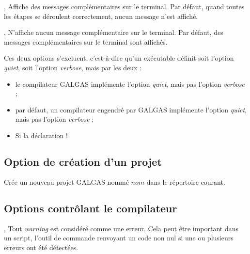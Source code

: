 {


,  Affiche des messages complémentaires sur le terminal. Par défaut, quand toutes les étapes se déroulent correctement, aucun message n’est affiché.

,  N'affiche aucun message complémentaire sur le terminal. Par défaut, des messages complémentaires sur le terminal sont affichés.

Ces deux options s'excluent, c'est-à-dire qu'un exécutable définit soit l'option \emph{quiet}, soit l'option \emph{verbose}, mais par les deux :
\begin{itemize}
  \item le compilateur GALGAS implémente l'option \emph{quiet}, mais pas l'option \emph{verbose} ;
  \item par défaut, un compilateur engendré par GALGAS implémente l'option \emph{quiet}, mais pas l'option \emph{verbose} ;
  \item Si la déclaration \ggst!%
\end{itemize}





\subsection{Option de création d'un projet}


 Crée un nouveau projet GALGAS nommé $nom$ dans le répertoire courant.




\subsection{Options contrôlant le compilateur}





,  Tout \emph{warning} est considéré comme une erreur. Cela peut être important dans un script, l’outil de commande renvoyant un code non nul si une ou plusieurs erreurs ont été détectées.

}
